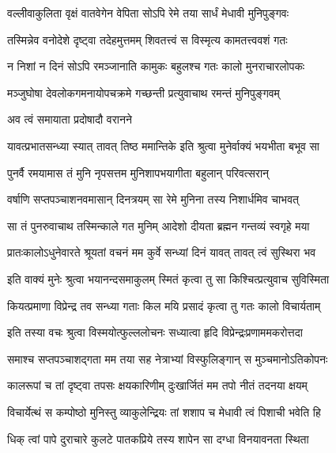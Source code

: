 \twolineshloka
{वल्लीवाकुलिता वृक्षं वातवेगेन वेपिता}
{सोऽपि रेमे तया सार्धं मेधावी मुनिपुङ्गवः} %

\twolineshloka
{तस्मिन्नेव वनोदेशे दृष्ट्वा तदेहमुत्तमम्}
{शिवतत्त्वं स विस्मृत्य कामतत्त्ववशं गतः} %

\twolineshloka
{न निशां न दिनं सोऽपि रमञ्जानाति कामुकः}
{बहुलश्च गतः कालो मुनराचारलोपकः} %

\twolineshloka
{मञ्जुघोषा देवलोकगमनायोपचक्रमे}
{गच्छन्ती प्रत्युवाचाथ रमन्तं मुनिपुङ्गवम्} %



\onelineshloka
{अव त्वं समायाता प्रदोषादौ वरानने} %

\twolineshloka
{यावत्प्रभातसन्ध्या स्यात् तावत् तिष्ठ ममान्तिके}
{इति श्रुत्वा मुनेर्वाक्यं भयभीता बभूव सा} %

\twolineshloka
{पुनर्वै रमयामास तं मुनि नृपसत्तम}
{मुनिशापभयागीता बहुलान् परिवत्सरान्} %

\twolineshloka
{वर्षाणि सप्तपञ्चाशनवमासान् दिनत्रयम्}
{सा रेमे मुनिना तस्य निशार्धमिव चाभवत्} %

\twolineshloka
{सा तं पुनरुवाचाथ तस्मिन्काले गत मुनिम्}
{आदेशो दीयता ब्रह्मन गन्तव्यं स्वगृहे मया} %


\twolineshloka
{प्रातःकालोऽधुनेवारते श्रूयतां वचनं मम}
{कुर्वे सन्ध्यां दिनं यावत् तावत् त्वं सुस्थिरा भव} %

\twolineshloka
{इति वाक्यं मुनेः श्रुत्वा भयानन्दसमाकुलम्}
{स्मितं कृत्वा तु सा किश्चित्प्रत्युवाच सुविस्मिता} %


\twolineshloka
{कियत्प्रमाणा विप्रेन्द्र तव सन्ध्या गताः किल}
{मयि प्रसादं कृत्वा तु गतः कालो विचार्यताम्} %

\twolineshloka
{इति तस्या वचः श्रुत्वा विस्मयोत्फुल्ललोचनः}
{सध्यात्वा हृदि विप्रेन्द्रःप्रणाममकरोत्तदा} %

\twolineshloka
{समाश्च सप्तपञ्चाशद्गता मम तया सह}
{नेत्राभ्यां विस्फुलिङ्गान् स मुञ्चमानोऽतिकोपनः} %

\twolineshloka
{कालरूपां च तां दृष्ट्वा तपसः क्षयकारिणीम्}
{दुःखार्जितं मम तपो नीतं तदनया क्षयम्} %

\twolineshloka
{विचार्येत्थं स कम्पोष्ठो मुनिस्तु व्याकुलेन्द्रियः}
{तां शशाप च मेधावी त्वं पिशाची भवेति हि} %

\twolineshloka
{धिक् त्वां पापे दुराचारे कुलटे पातकप्रिये}
{तस्य शापेन सा दग्धा विनयावनता स्थिता} %


